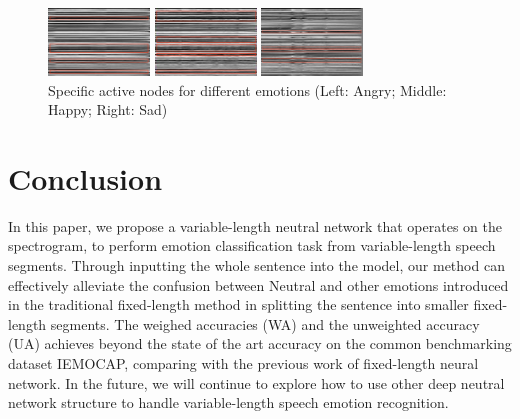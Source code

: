 \documentclass[a4paper]{article}
\begin{document}
\begin{figure}[htb]
    \begin{minipage}[b]{0.27\linewidth}
      \centering
      \centerline{\includegraphics[width=2.7cm]{rnn_out_var_ang}}
    \end{minipage}
    \hfill
    \begin{minipage}[b]{0.27\linewidth}
      \centering
      \centerline{\includegraphics[width=2.7cm]{rnn_out_var_hap}}
    \end{minipage}
    \hfill
    \begin{minipage}[b]{0.27\linewidth}
      \centering
      \centerline{\includegraphics[width=2.7cm]{rnn_out_var_sad}}
    \end{minipage}
    \caption{Specific active nodes for different emotions (Left: Angry; Middle: Happy; Right: Sad)}
    \label{fig:rnn_emo}
\end{figure}

    
\section{Conclusion}
\label{sec:conclusion}

In this paper, we propose a variable-length neutral network that operates on the spectrogram, to perform emotion classification task from variable-length speech segments. Through inputting the whole sentence into the model, our method can effectively alleviate the confusion between Neutral and other emotions introduced in the traditional fixed-length method in splitting the sentence into smaller fixed-length segments. The weighed accuracies (WA) and the unweighted accuracy (UA) achieves beyond the state of the art accuracy on the common benchmarking dataset IEMOCAP, comparing with the previous work of fixed-length neural network. In the future, we will continue to explore how to use other deep neutral network structure to handle variable-length speech emotion recognition.
\end{document}
